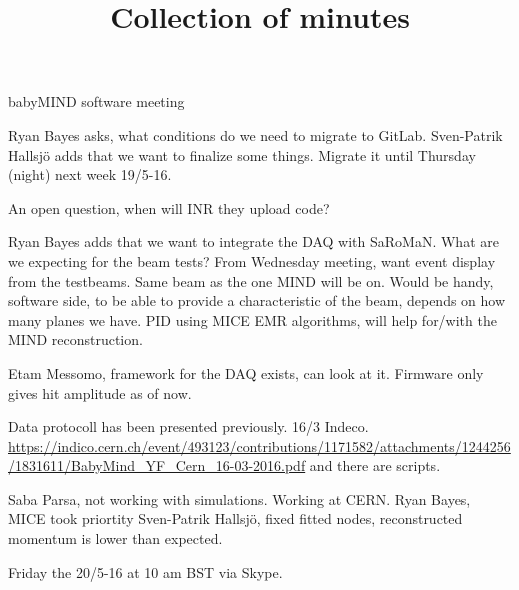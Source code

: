 \documentclass{article}
\title{Collection of minutes}
\author{\LaTeXe}
\begin{document}
\begin{Minutes}{babyMIND software meeting}

\maketitle

Ryan Bayes asks, what conditions do we need to migrate to GitLab.
Sven-Patrik Hallsj\"o adds that we want to finalize some things.
Migrate it until Thursday (night) next week 19/5-16.

An open question, when will INR they upload code?

Ryan Bayes adds that we want to integrate the DAQ with SaRoMaN.
What are we expecting for the beam tests?
From Wednesday meeting, want event display from the testbeams.
Same beam as the one MIND will be on. Would be handy, software side, to be able to provide a characteristic of the beam, depends on how many planes we have. PID using MICE EMR algorithms, will help for/with the MIND reconstruction. 

Etam Messomo, framework for the DAQ exists, can look at it. Firmware only gives hit amplitude as of now. 

Data protocoll has been presented previously.
16/3 Indeco.
\url{https://indico.cern.ch/event/493123/contributions/1171582/attachments/1244256/1831611/BabyMind_YF_Cern_16-03-2016.pdf}
and there are  scripts.

Saba Parsa, not working with simulations. Working at CERN.
Ryan Bayes, MICE took priortity 
Sven-Patrik Hallsj\"o, fixed fitted nodes, reconstructed momentum is lower than expected.

Friday the 20/5-16 at 10 am BST via Skype.

\end{Minutes}
\end{document}
